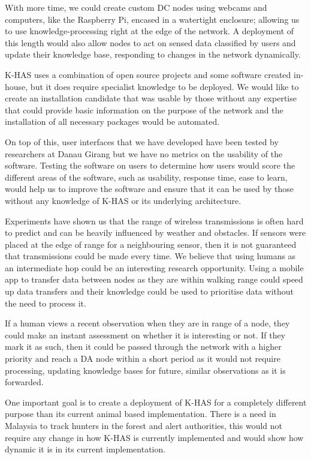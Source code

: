 With more time, we could create custom DC nodes using webcams and computers, like the Raspberry Pi, encased in a watertight enclosure; allowing us to use knowledge-processing right at the edge of the network. A deployment of this length would also allow nodes to act on sensed data classified by users and update their knowledge base, responding to changes in the network dynamically.

K-HAS uses a combination of open source projects and some software created in-house, but it does require specialist knowledge to be deployed. We would like to create an installation candidate that was usable by those without any expertise that could provide basic information on the purpose of the network and the installation of all necessary packages would be automated.

On top of this, user interfaces that we have developed have been tested by researchers at Danau Girang but we have no metrics on the usability of the software. Testing the software on users to determine how users would score the different areas of the software, such as usability, response time, ease to learn, would help us to improve the software and ensure that it can be used by those without any knowledge of K-HAS or its underlying architecture.

Experiments have shown us that the range of wireless transmissions is often hard to predict and can be heavily influenced by weather and obstacles. If sensors were placed at the edge of range for a neighbouring sensor, then it is not guaranteed that transmissions could be made every time. We believe that using humans as an intermediate hop could be an interesting research opportunity. Using a mobile app to transfer data between nodes as they are within walking range could speed up data transfers and their knowledge could be used to prioritise data without the need to process it.

If a human views a recent observation when they are in range of a node, they could make an instant assessment on whether it is interesting or not. If they mark it as such, then it could be passed through the network with a higher priority and reach a DA node within a short period as it would not require processing, updating knowledge bases for future, similar observations as it is forwarded.

One important goal is to create a deployment of K-HAS for a completely different purpose than its current animal based implementation. There is a need in Malaysia to track hunters in the forest and alert authorities, this would not require any change in how K-HAS is currently implemented and would show how dynamic it is in its current implementation.

